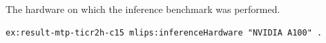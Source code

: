 The hardware on which the inference benchmark was performed.
\begin{lstlisting}[language=turtle]
ex:result-mtp-ticr2h-c15 mlips:inferenceHardware "NVIDIA A100" .
\end{lstlisting}
